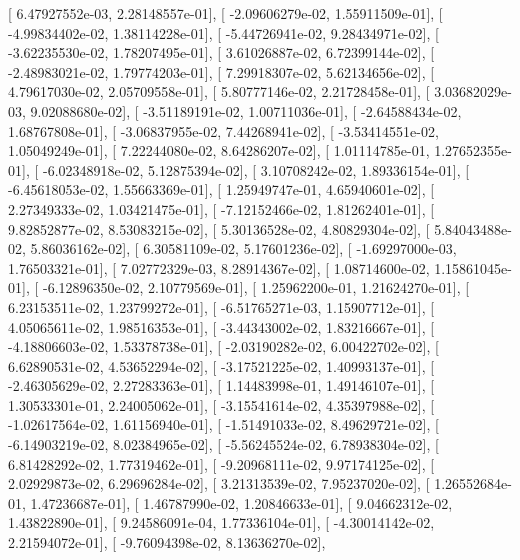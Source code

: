 \documentclass{article}
\begin{document}
       [  6.47927552e-03,   2.28148557e-01],
       [ -2.09606279e-02,   1.55911509e-01],
       [ -4.99834402e-02,   1.38114228e-01],
       [ -5.44726941e-02,   9.28434971e-02],
       [ -3.62235530e-02,   1.78207495e-01],
       [  3.61026887e-02,   6.72399144e-02],
       [ -2.48983021e-02,   1.79774203e-01],
       [  7.29918307e-02,   5.62134656e-02],
       [  4.79617030e-02,   2.05709558e-01],
       [  5.80777146e-02,   2.21728458e-01],
       [  3.03682029e-03,   9.02088680e-02],
       [ -3.51189191e-02,   1.00711036e-01],
       [ -2.64588434e-02,   1.68767808e-01],
       [ -3.06837955e-02,   7.44268941e-02],
       [ -3.53414551e-02,   1.05049249e-01],
       [  7.22244080e-02,   8.64286207e-02],
       [  1.01114785e-01,   1.27652355e-01],
       [ -6.02348918e-02,   5.12875394e-02],
       [  3.10708242e-02,   1.89336154e-01],
       [ -6.45618053e-02,   1.55663369e-01],
       [  1.25949747e-01,   4.65940601e-02],
       [  2.27349333e-02,   1.03421475e-01],
       [ -7.12152466e-02,   1.81262401e-01],
       [  9.82852877e-02,   8.53083215e-02],
       [  5.30136528e-02,   4.80829304e-02],
       [  5.84043488e-02,   5.86036162e-02],
       [  6.30581109e-02,   5.17601236e-02],
       [ -1.69297000e-03,   1.76503321e-01],
       [  7.02772329e-03,   8.28914367e-02],
       [  1.08714600e-02,   1.15861045e-01],
       [ -6.12896350e-02,   2.10779569e-01],
       [  1.25962200e-01,   1.21624270e-01],
       [  6.23153511e-02,   1.23799272e-01],
       [ -6.51765271e-03,   1.15907712e-01],
       [  4.05065611e-02,   1.98516353e-01],
       [ -3.44343002e-02,   1.83216667e-01],
       [ -4.18806603e-02,   1.53378738e-01],
       [ -2.03190282e-02,   6.00422702e-02],
       [  6.62890531e-02,   4.53652294e-02],
       [ -3.17521225e-02,   1.40993137e-01],
       [ -2.46305629e-02,   2.27283363e-01],
       [  1.14483998e-01,   1.49146107e-01],
       [  1.30533301e-01,   2.24005062e-01],
       [ -3.15541614e-02,   4.35397988e-02],
       [ -1.02617564e-02,   1.61156940e-01],
       [ -1.51491033e-02,   8.49629721e-02],
       [ -6.14903219e-02,   8.02384965e-02],
       [ -5.56245524e-02,   6.78938304e-02],
       [  6.81428292e-02,   1.77319462e-01],
       [ -9.20968111e-02,   9.97174125e-02],
       [  2.02929873e-02,   6.29696284e-02],
       [  3.21313539e-02,   7.95237020e-02],
       [  1.26552684e-01,   1.47236687e-01],
       [  1.46787990e-02,   1.20846633e-01],
       [  9.04662312e-02,   1.43822890e-01],
       [  9.24586091e-04,   1.77336104e-01],
       [ -4.30014142e-02,   2.21594072e-01],
       [ -9.76094398e-02,   8.13636270e-02],
\end{document}
